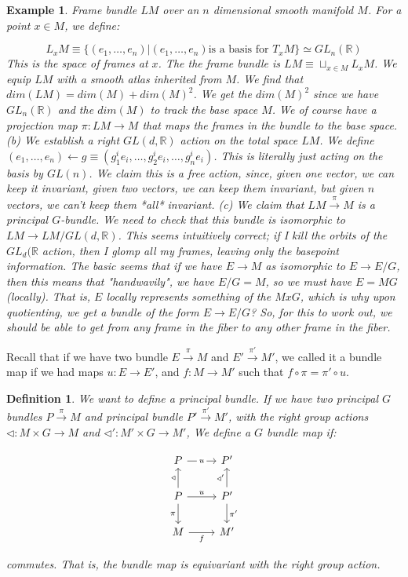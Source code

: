 \documentclass[11pt]{book}
\newtheorem{definition}[theorem]{Definition}
\newtheorem{example}[theorem]{Example}
\begin{document}
\begin{example}
Frame bundle $LM$ over an $n$ dimensional smooth manifold $M$. For a point $x \in M$, we define:

$$L_x M \equiv \{ (e_1, \dots, e_n) | (e_1, \dots, e_n) \text{is a basis for $T_x M$} \} \simeq GL_n(\mathbb R)$$
This is the space of frames at $x$. The the frame bundle is $LM \equiv \sqcup_{x \in M} L_x M$.
We equip $LM$ with a smooth atlas inherited from $M$. We find that $dim(LM) = dim(M) + dim(M)^2$. We get the
$dim(M)^2$ since we have $GL_n(\mathbb R)$ and the $dim(M)$ to track the base space $M$. We of course
have a projection map $\pi: LM \rightarrow M$ that maps the frames in the bundle to the base space.
(b) We establish a right $GL(d, \mathbb R)$ action on the total space $LM$. We define
$(e_1, \dots, e_n) \leftarrow g \equiv (g^i_1 e_i, \dots, g^i_2 e_i, \dots, g^i_n e_i)$.
This is literally just acting on the basis by $GL(n)$. We claim this is a free action, since,
given one vector, we can keep it invariant, given two vectors, we can keep them invariant, but given $n$
vectors, we can't keep them *all* invariant. (c) We claim that $LM \xrightarrow{\pi} M$ is a principal $G$-bundle.
We need to check that this bundle is isomorphic to $LM \rightarrow LM/GL(d, \mathbb R)$. This seems intuitively
correct; if I kill the orbits of the $GL_d(\mathbb R$ action, then I glomp all my frames, leaving only the
basepoint information. The   basic seems that if we have $E\rightarrow M$ as isomorphic to $E \rightarrow E/G$,
then this means that "handwavily", we have $E/G = M$, so we must have $E = MG$ (locally).
That is, $E$ locally represents something of the $M x G$, which is why upon quotienting,
we get a bundle of the form $E \rightarrow E/G$? So, for this to work out, we should be able to get
from any frame in the fiber to any other frame in the fiber.
\end{example}


Recall that if we have two bundle $E \xrightarrow{\pi} M$ and $E' \xrightarrow{\pi'} M'$, we called
it a bundle map if we had maps $u: E \rightarrow E'$, and $f: M \rightarrow M'$ such that $f \circ \pi = \pi' \circ u$.

\begin{definition}
We want to define a principal bundle. If we have two principal $G$ bundles $P \xrightarrow{\pi} M$ and 
principal bundle $P' \xrightarrow{\pi'} M'$, with the right group actions $\triangleleft: M \times G \rightarrow M$
and $\triangleleft': M' \times G \rightarrow M'$, We define a $G$ bundle map if:


\[\begin{tikzcd}
	P & {P'} \\
	P & {P'} \\
	M & {M'}
	\arrow["\triangleleft", from=2-1, to=1-1]
	\arrow["\pi"', from=2-1, to=3-1]
	\arrow["u", from=2-1, to=2-2]
	\arrow["{\triangleleft'}", from=2-2, to=1-2]
	\arrow["{\pi'}", from=2-2, to=3-2]
	\arrow["f"', from=3-1, to=3-2]
	\arrow["u"{description}, from=1-1, to=1-2]
\end{tikzcd}\]


commutes. That is, the bundle map is equivariant with the right group action.
\end{definition}
\end{document}
